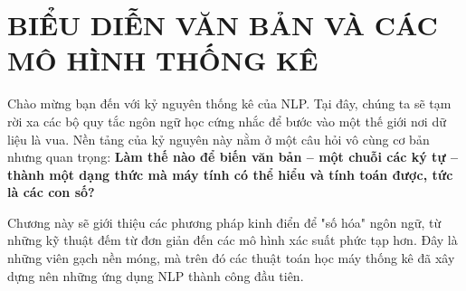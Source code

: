 \chapter{BIỂU DIỄN VĂN BẢN VÀ CÁC MÔ HÌNH THỐNG KÊ}
\label{chap:bieu_dien_van_ban}

Chào mừng bạn đến với kỷ nguyên thống kê của NLP. Tại đây, chúng ta sẽ tạm rời xa các bộ quy tắc ngôn ngữ học cứng nhắc để bước vào một thế giới nơi dữ liệu là vua. Nền tảng của kỷ nguyên này nằm ở một câu hỏi vô cùng cơ bản nhưng quan trọng: \textbf{Làm thế nào để biến văn bản -- một chuỗi các ký tự -- thành một dạng thức mà máy tính có thể hiểu và tính toán được, tức là các con số?}

Chương này sẽ giới thiệu các phương pháp kinh điển để "số hóa" ngôn ngữ, từ những kỹ thuật đếm từ đơn giản đến các mô hình xác suất phức tạp hơn. Đây là những viên gạch nền móng, mà trên đó các thuật toán học máy thống kê đã xây dựng nên những ứng dụng NLP thành công đầu tiên.